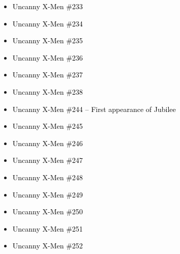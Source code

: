 \documentclass[12pt]{article}
\newcommand{\checkbox}{\raisebox{0.0ex}{\fbox{\rule{0ex}{1.5ex} \rule{1.5ex}{0ex}}}}
\begin{document}
\vspace{0.3cm}
\noindent
\begin{tcolorbox}[
  colback=white!95!gray,
  colframe=black,
  width=\textwidth,
  arc=4mm,
  auto outer arc,
  boxrule=0.8pt,
  left=8pt,right=8pt,top=8pt,bottom=8pt
]
\begin{itemize}[left=0pt,label={\checkbox}]
    \item \textcolor{black}{Uncanny X-Men \#233}
    \item \textcolor{black}{Uncanny X-Men \#234}
    \item \textcolor{black}{Uncanny X-Men \#235}
    \item \textcolor{black}{Uncanny X-Men \#236}
    \item \textcolor{black}{Uncanny X-Men \#237}
    \item \textcolor{black}{Uncanny X-Men \#238}
    \item \textcolor{black}{Uncanny X-Men \#244 – First appearance of Jubilee}
    \item \textcolor{black}{Uncanny X-Men \#245}
    \item \textcolor{black}{Uncanny X-Men \#246}
    \item \textcolor{black}{Uncanny X-Men \#247}
    \item \textcolor{black}{Uncanny X-Men \#248}
    \item \textcolor{black}{Uncanny X-Men \#249}
    \item \textcolor{black}{Uncanny X-Men \#250}
    \item \textcolor{black}{Uncanny X-Men \#251}
    \item \textcolor{black}{Uncanny X-Men \#252}
\end{itemize}
\end{tcolorbox}

\newpage
{}
\end{document}

